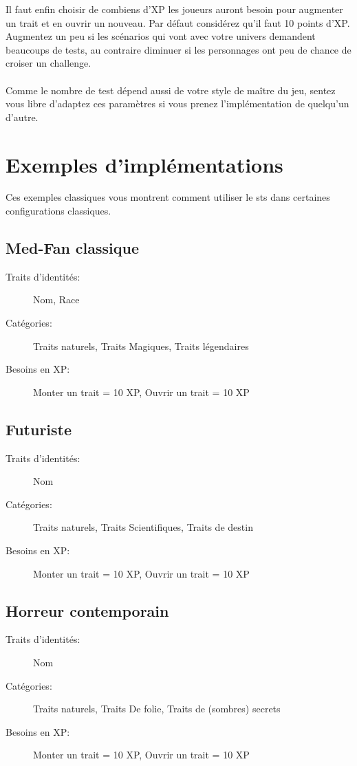 \documentclass[a4paper,10pt,twoside,twocolumn]{article}
\begin{document}
 Il faut enfin choisir de combiens d'XP les joueurs auront besoin pour augmenter un trait et en ouvrir un nouveau. Par défaut considérez qu'il faut 10 points d'XP. Augmentez un peu si les scénarios qui vont avec votre univers demandent beaucoups de tests, au contraire diminuer si les personnages ont peu de chance de croiser un challenge.\\
 \\
 Comme le nombre de test dépend aussi de votre style de maître du jeu, sentez vous libre d'adaptez ces paramètres si vous prenez l'implémentation de quelqu'un d'autre.
 
 \section{Exemples d'implémentations}
 \label{exempl}
 
 Ces exemples classiques vous montrent comment utiliser le sts dans certaines configurations classiques.
 
 \subsection{Med-Fan classique}
 
 \begin{description}
  \item [Traits d'identités:] Nom, Race
  \item [Catégories:] Traits naturels, Traits Magiques, Traits légendaires
  \item [Besoins en XP:] Monter un trait = 10 XP, Ouvrir un trait = 10 XP
 \end{description}
 
 \subsection{Futuriste}
 
 \begin{description}
  \item [Traits d'identités:] Nom
  \item [Catégories:] Traits naturels, Traits Scientifiques, Traits de destin
  \item [Besoins en XP:] Monter un trait = 10 XP, Ouvrir un trait = 10 XP
 \end{description}
 
 \subsection{Horreur contemporain}
 
 \begin{description}
  \item [Traits d'identités:] Nom
  \item [Catégories:] Traits naturels, Traits De folie, Traits de (sombres) secrets
  \item [Besoins en XP:] Monter un trait = 10 XP, Ouvrir un trait = 10 XP
 \end{description}
 
\end{document}

